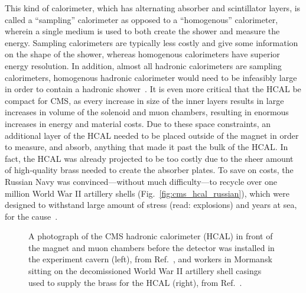 This kind of calorimeter, which has alternating absorber and scintillator layers, is called a ``sampling'' calorimeter as opposed to a ``homogenous'' calorimeter, wherein a single medium is used to both create the shower and measure the energy. 
Sampling calorimeters are typically less costly and give some information on the shape of the shower, whereas homogenous calorimeters have superior energy resolution. 
In addition, almost all hadronic calorimeters are sampling calorimeters, homogenous hadronic calorimeter would need to be infeasibly large in order to contain a hadronic shower~\cite{KolanoskiWermesDetectors}. 
It is even more critical that the HCAL be compact for CMS, as every increase in size of the inner layers results in large increases in volume of the solenoid and muon chambers, resulting in enormous increases in energy and material costs. 
Due to these space constraints, an additional layer of the HCAL needed to be placed outside of the magnet in order to measure, and absorb, anything that made it past the bulk of the HCAL. 
In fact, the HCAL was already projected to be too costly due to the sheer amount of high-quality brass needed to create the absorber plates. 
To save on costs, the Russian Navy was convinced---without much difficulty---to recycle over one million World War II artillery shells (Fig.~\ref{fig:cms_hcal_russian}), which were designed to withstand large amount of stress (read: explosions) and years at sea, for the cause~\cite{CMSWebHCAL}. 

\begin{figure}[htb]
    \centering
    \quad
    \caption{
        A photograph of the CMS hadronic calorimeter (HCAL) in front of the magnet and muon chambers before the detector was installed in the experiment cavern (left), from Ref.~\cite{Brice:1431485}, and workers in Mormansk sitting on the decomissioned World War II artillery shell casings used to supply the brass for the HCAL (right), from Ref.~\cite{GinterRussianDudes}.
    }
\end{figure}


